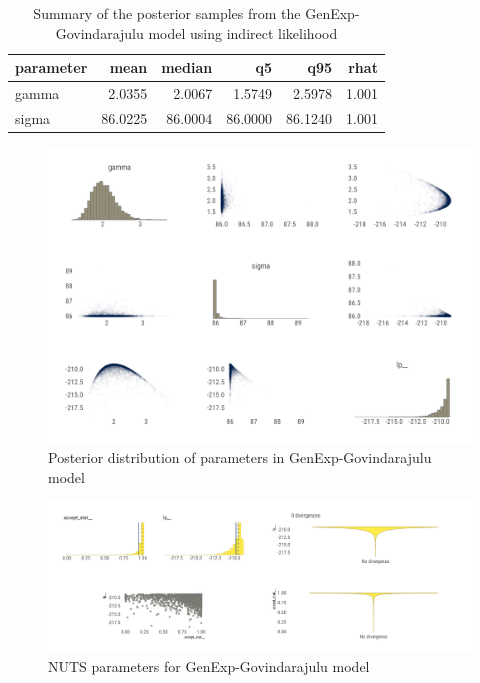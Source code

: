 \documentclass[ba]{imsart}
\numberwithin{equation}{section}
\theoremstyle{plain}
\begin{document}
\begin{table}[!h]

\caption{\label{tab:govi-tab}Summary of the posterior samples from the GenExp-Govindarajulu model using indirect likelihood}
\centering
\begin{tabular}[t]{lrrrrr}
\toprule
parameter & mean & median & q5 & q95 & rhat\\
\midrule
gamma & 2.0355 & 2.0067 & 1.5749 & 2.5978 & 1.001\\
sigma & 86.0225 & 86.0004 & 86.0000 & 86.1240 & 1.001\\
\bottomrule
\end{tabular}
\end{table}

\begin{figure}

{\centering \includegraphics[width=0.8\linewidth]{BA-submission_files/figure-latex/govi-pairs-graph-1} 

}

\caption{Posterior distribution of parameters in GenExp-Govindarajulu model}\label{fig:govi-pairs-graph}
\end{figure}

\begin{figure}

{\centering \includegraphics[width=1\linewidth]{BA-submission_files/figure-latex/govi-nuts-graph-1} 

}

\caption{NUTS parameters for GenExp-Govindarajulu model}\label{fig:govi-nuts-graph}
\end{figure}
\end{document}
